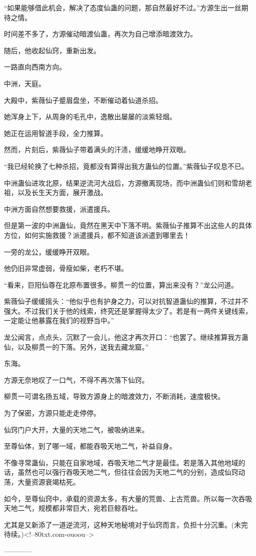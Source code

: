 \begin{this_body}
“如果能够借此机会，解决了态度仙蛊的问题，那自然最好不过。”方源生出一丝期待之情。

时间差不多了，方源催动暗渡仙蛊，再次为自己增添暗渡效力。

随后，他收起仙窍，重新出发。

一路直向西南方向。

中洲，天庭。

大殿中，紫薇仙子蹙眉盘坐，不断催动着仙道杀招。

她浑身上下，从周身的毛孔中，逸散出屡屡的淡紫轻烟。

她正在运用智道手段，全力推算。

然而，片刻后，紫薇仙子带着满头的汗渍，缓缓地睁开双眼。

“我已经轮换了七种杀招，竟都没有算得出我方蛊仙的位置。”紫薇仙子叹息不已。

中洲蛊仙进攻北原，结果逆流河大战后，方源撤离现场，而中洲蛊仙们则和雪胡老祖，以及长生天方面，展开激战。

中洲方面自然想要救援，派遣援兵。

但是第一波的中洲蛊仙，竟然在黑天中下落不明。紫薇仙子推算不出这些人的具体方位，如何实施救援？派遣援兵，都不知道该派遣到哪里去！

一旁的龙公，缓缓睁开双眼。

他仍旧非常虚弱，骨瘦如柴，老朽不堪。

“看来，巨阳仙尊在北原布置很多。柳贯一的位置，算出来没有？”龙公问道。

紫薇仙子缓缓摇头：“他似乎也有护身之力，可以对抗智道蛊仙的推算，不过并不强大。不过我们关于他的线索，终究还是掌握得太少了。若是有一两件关键线索，一定能让他暴露在我们的视野当中。”

龙公闻言，点点头，沉默了一会儿，他这才再次开口：“也罢了。继续推算我方蛊仙，以及柳贯一的下落。另外，送我去藏龙窟。”

东海。

方源无奈地叹了一口气，不得不再次落下仙窍。

柳贯一可谓名扬五域，导致方源身上的暗渡效力，不断消耗，速度极快。

为了保密，方源只能走走停停。

仙窍门户大开，大量的天地二气，被吸纳进来。

至尊仙体，到了哪一域，都能吞吸天地二气，补益自身。

不像寻常蛊仙，只能在自家地域，吞吸天地二气才是最佳。若是落入其他地域的话，虽然也可以强行吞吸天地二气，但往往会因为天地二气的分别，造成仙窍动荡，大量资源衰竭枯死。

如今，至尊仙窍中，承载的资源太多，有大量的荒兽、上古荒兽。所以每一次吞吸天地二气，规模都非常巨大，宛若巨鲸吞吐。

尤其是又新添了一道逆流河，这种天地秘境对于仙窍而言，负担十分沉重。(未完待续。)<!--80txt.com-ouoou-->

------------

\end{this_body}

